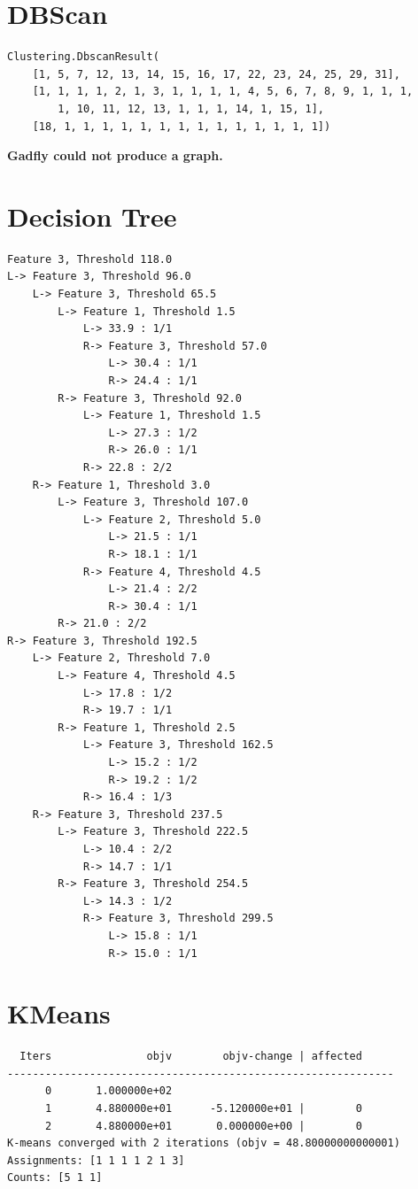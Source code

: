 \RequirePackage[l2tabu, orthodox]{nag} \documentclass[12pt]{scrartcl}
\begin{document}
\section{DBScan}

\begin{verbatim}
Clustering.DbscanResult(
    [1, 5, 7, 12, 13, 14, 15, 16, 17, 22, 23, 24, 25, 29, 31],
    [1, 1, 1, 1, 2, 1, 3, 1, 1, 1, 1, 4, 5, 6, 7, 8, 9, 1, 1, 1,
        1, 10, 11, 12, 13, 1, 1, 1, 14, 1, 15, 1],
    [18, 1, 1, 1, 1, 1, 1, 1, 1, 1, 1, 1, 1, 1, 1])
\end{verbatim}

\textbf{Gadfly could not produce a graph.}

\section{Decision Tree}


\begin{verbatim}
Feature 3, Threshold 118.0
L-> Feature 3, Threshold 96.0
    L-> Feature 3, Threshold 65.5
        L-> Feature 1, Threshold 1.5
            L-> 33.9 : 1/1
            R-> Feature 3, Threshold 57.0
                L-> 30.4 : 1/1
                R-> 24.4 : 1/1
        R-> Feature 3, Threshold 92.0
            L-> Feature 1, Threshold 1.5
                L-> 27.3 : 1/2
                R-> 26.0 : 1/1
            R-> 22.8 : 2/2
    R-> Feature 1, Threshold 3.0
        L-> Feature 3, Threshold 107.0
            L-> Feature 2, Threshold 5.0
                L-> 21.5 : 1/1
                R-> 18.1 : 1/1
            R-> Feature 4, Threshold 4.5
                L-> 21.4 : 2/2
                R-> 30.4 : 1/1
        R-> 21.0 : 2/2
R-> Feature 3, Threshold 192.5
    L-> Feature 2, Threshold 7.0
        L-> Feature 4, Threshold 4.5
            L-> 17.8 : 1/2
            R-> 19.7 : 1/1
        R-> Feature 1, Threshold 2.5
            L-> Feature 3, Threshold 162.5
                L-> 15.2 : 1/2
                R-> 19.2 : 1/2
            R-> 16.4 : 1/3
    R-> Feature 3, Threshold 237.5
        L-> Feature 3, Threshold 222.5
            L-> 10.4 : 2/2
            R-> 14.7 : 1/1
        R-> Feature 3, Threshold 254.5
            L-> 14.3 : 1/2
            R-> Feature 3, Threshold 299.5
                L-> 15.8 : 1/1
                R-> 15.0 : 1/1
\end{verbatim}

\section{KMeans}

\begin{verbatim}
  Iters               objv        objv-change | affected
-------------------------------------------------------------
      0       1.000000e+02
      1       4.880000e+01      -5.120000e+01 |        0
      2       4.880000e+01       0.000000e+00 |        0
K-means converged with 2 iterations (objv = 48.80000000000001)
Assignments: [1 1 1 1 2 1 3]
Counts: [5 1 1]
\end{verbatim}
\end{document}
